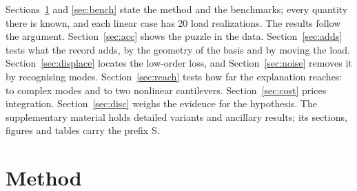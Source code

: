\documentclass[preprint,12pt]{elsarticle}
\begin{document}
Sections~\ref{sec:method} and \ref{sec:bench} state the method and the benchmarks; every quantity there is known, and each linear case has 20 load realizations.
The results follow the argument.
Section~\ref{sec:acc} shows the puzzle in the data.
Section~\ref{sec:adds} tests what the record adds, by the geometry of the basis and by moving the load.
Section~\ref{sec:displace} locates the low-order loss, and Section~\ref{sec:noise} removes it by recognising modes.
Section~\ref{sec:reach} tests how far the explanation reaches: to complex modes and to two nonlinear cantilevers. Section~\ref{sec:cost} prices integration.
Section~\ref{sec:disc} weighs the evidence for the hypothesis. The supplementary material holds detailed variants and ancillary results; its sections, figures and tables carry the prefix S.


\section{Method}\label{sec:method}
\end{document}
